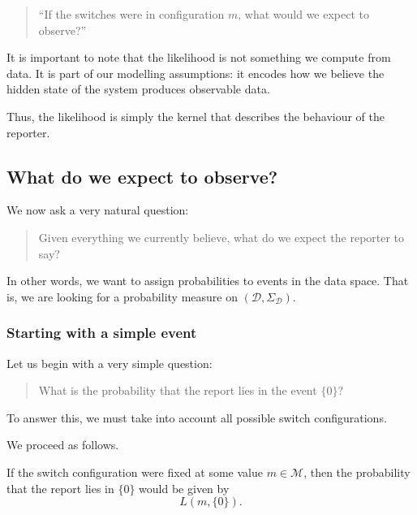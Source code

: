 \documentclass[11pt]{article}
\theoremstyle{remark}
\newcommand{\modelspace}{\mathcal{M}}
\newcommand{\dataspace}{\mathcal{D}}
\begin{document}
\begin{quote}
``If the switches were in configuration \(m\), what would we expect to observe?''
\end{quote}

It is important to note that the likelihood is not something we compute from data. It is part of our modelling assumptions: it encodes how we believe the hidden state of the system produces observable data.

\vspace{2mm}

Thus, the likelihood is simply the kernel that describes the behaviour of the reporter.



\subsection{What do we expect to observe?}

We now ask a very natural question:

\begin{quote}
Given everything we currently believe, what do we expect the reporter to say?
\end{quote}

In other words, we want to assign probabilities to events in the data space. That is, we are looking for a probability measure on \((\dataspace, \Sigma_{\dataspace})\).

\vspace{2mm}

\subsubsection{Starting with a simple event}

Let us begin with a very simple question:

\begin{quote}
What is the probability that the report lies in the event \(\{0\}\)?
\end{quote}

To answer this, we must take into account all possible switch configurations.

\vspace{2mm}

We proceed as follows.

If the switch configuration were fixed at some value \(m \in \modelspace\), then the probability that the report lies in \(\{0\}\) would be given by
\[
L(m,\{0\}).
\]
\end{document}
